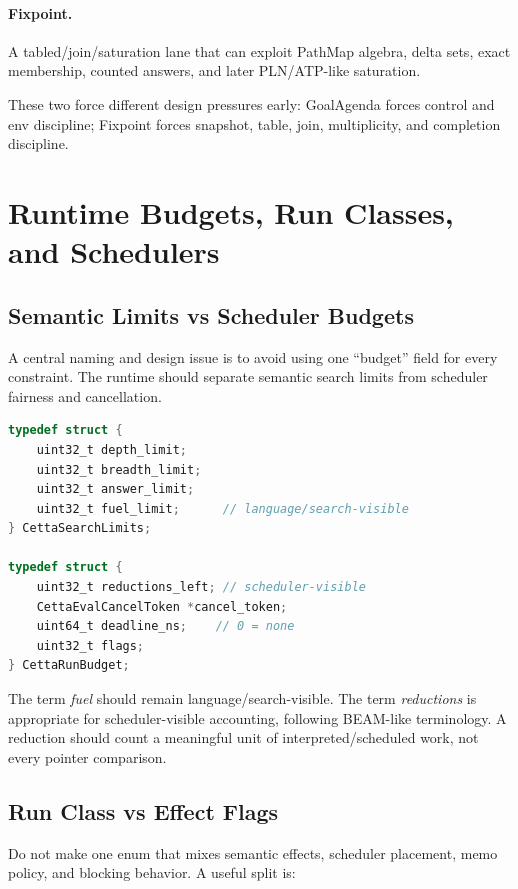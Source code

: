 \documentclass[11pt]{article}
\newcommand{\PathMap}{PathMap}
\begin{document}
\paragraph{Fixpoint.}  A tabled/join/saturation lane that can exploit \PathMap{} algebra, delta sets, exact membership, counted answers, and later PLN/ATP-like saturation.

These two force different design pressures early: GoalAgenda forces control and env discipline; Fixpoint forces snapshot, table, join, multiplicity, and completion discipline.

\section{Runtime Budgets, Run Classes, and Schedulers}\label{sec:runtime-budget}

\subsection{Semantic Limits vs Scheduler Budgets}

A central naming and design issue is to avoid using one ``budget'' field for every constraint.  The runtime should separate semantic search limits from scheduler fairness and cancellation.

\begin{lstlisting}[language=C]
typedef struct {
    uint32_t depth_limit;
    uint32_t breadth_limit;
    uint32_t answer_limit;
    uint32_t fuel_limit;      // language/search-visible
} CettaSearchLimits;

typedef struct {
    uint32_t reductions_left; // scheduler-visible
    CettaEvalCancelToken *cancel_token;
    uint64_t deadline_ns;    // 0 = none
    uint32_t flags;
} CettaRunBudget;
\end{lstlisting}

The term \emph{fuel} should remain language/search-visible.  The term \emph{reductions} is appropriate for scheduler-visible accounting, following BEAM-like terminology.  A reduction should count a meaningful unit of interpreted/scheduled work, not every pointer comparison.

\subsection{Run Class vs Effect Flags}

Do not make one enum that mixes semantic effects, scheduler placement, memo policy, and blocking behavior.  A useful split is:
\end{document}
